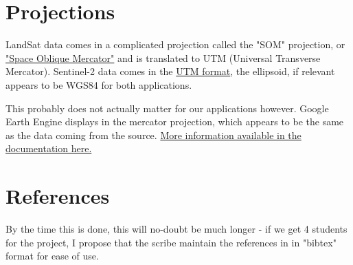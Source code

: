 \documentclass[
    ngerman,american
    ]{scrartcl}
\begin{document}
            \section{Projections}

                LandSat data comes in a complicated projection called the "SOM" projection, or \href{https://landsat.gsfc.nasa.gov/about/space-oblique-mercator-projection/}{"Space Oblique Mercator"} and is translated to UTM (Universal Transverse Mercator).  Sentinel-2 data comes in the \href{https://www.sentinel-hub.com/faq/which-projection-best-exporting-data/}{UTM format}, the ellipsoid, if relevant appears to be WGS84 for both applications.

                This probably does not actually matter for our applications however.  Google Earth Engine displays in the mercator projection, which appears to be the same as the data coming from the source.  \href{https://developers.google.com/earth-engine/guides/projections}{More information available in the documentation here.}

                
        
        \section{References}

            By the time this is done, this will no-doubt be much longer - if we get 4 students for the project, I propose that the scribe maintain the references in in "bibtex" format for ease of use.  
        
            
            
\end{document}
